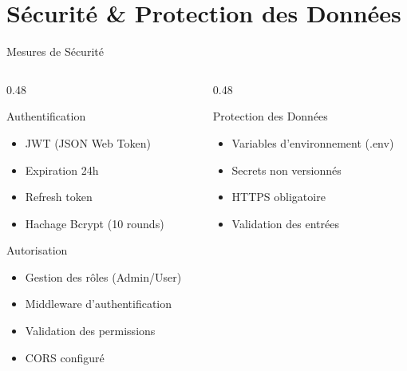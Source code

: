 \documentclass[aspectratio=169]{beamer}
\begin{document}
\section{Sécurité \& Protection des Données}

\begin{frame}{Mesures de Sécurité}
    \begin{columns}[T]
        \begin{column}{0.48\textwidth}
            \begin{block}{Authentification}
                \begin{itemize}
                    \item JWT (JSON Web Token)
                    \item Expiration 24h
                    \item Refresh token
                    \item Hachage Bcrypt (10 rounds)
                \end{itemize}
            \end{block}

            \vspace{0.3cm}

            \begin{block}{Autorisation}
                \begin{itemize}
                    \item Gestion des rôles (Admin/User)
                    \item Middleware d'authentification
                    \item Validation des permissions
                    \item CORS configuré
                \end{itemize}
            \end{block}
        \end{column}
        \begin{column}{0.48\textwidth}
            \begin{block}{Protection des Données}
                \begin{itemize}
                    \item Variables d'environnement (.env)
                    \item Secrets non versionnés
                    \item HTTPS obligatoire
                    \item Validation des entrées
                \end{itemize}
            \end{block}


\end{column}
\end{columns}
\end{frame}
\end{document}
